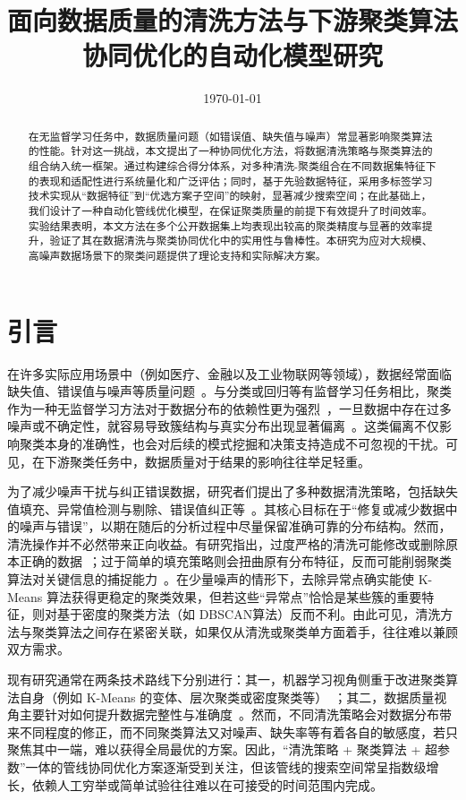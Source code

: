 \documentclass[10pt]{article} %
\numberwithin{equation}{section}
\begin{document}
\title{\textbf{面向数据质量的清洗方法与下游聚类算法协同优化的自动化模型研究}}
\date{\today}
\maketitle
\begin{abstract}
\normalsize
在无监督学习任务中，数据质量问题（如错误值、缺失值与噪声）常显著影响聚类算法的性能。针对这一挑战，本文提出了一种协同优化方法，将数据清洗策略与聚类算法的组合纳入统一框架。通过构建综合得分体系，对多种清洗-聚类组合在不同数据集特征下的表现和适配性进行系统量化和广泛评估；同时，基于先验数据特征，采用多标签学习技术实现从“数据特征”到“优选方案子空间”的映射，显著减少搜索空间；在此基础上，我们设计了一种自动化管线优化模型，在保证聚类质量的前提下有效提升了时间效率。实验结果表明，本文方法在多个公开数据集上均表现出较高的聚类精度与显著的效率提升，验证了其在数据清洗与聚类协同优化中的实用性与鲁棒性。本研究为应对大规模、高噪声数据场景下的聚类问题提供了理论支持和实际解决方案。
\end{abstract}

\section{引言}

在许多实际应用场景中（例如医疗、金融以及工业物联网等领域），数据经常面临缺失值、错误值与噪声等质量问题~\cite{ref1, ref2}。与分类或回归等有监督学习任务相比，聚类作为一种无监督学习方法对于数据分布的依赖性更为强烈~\cite{ref3}，一旦数据中存在过多噪声或不确定性，就容易导致簇结构与真实分布出现显著偏离~\cite{ref4}。这类偏离不仅影响聚类本身的准确性，也会对后续的模式挖掘和决策支持造成不可忽视的干扰。可见，在下游聚类任务中，数据质量对于结果的影响往往举足轻重。

为了减少噪声干扰与纠正错误数据，研究者们提出了多种数据清洗策略，包括缺失值填充、异常值检测与剔除、错误值纠正等~\cite{ref5}。其核心目标在于“修复或减少数据中的噪声与错误”，以期在随后的分析过程中尽量保留准确可靠的分布结构。然而，清洗操作并不必然带来正向收益。有研究指出，过度严格的清洗可能修改或删除原本正确的数据~\cite{ref6}；过于简单的填充策略则会扭曲原有分布特征，反而可能削弱聚类算法对关键信息的捕捉能力~\cite{ref7}。在少量噪声的情形下，去除异常点确实能使 K-Means 算法获得更稳定的聚类效果，但若这些“异常点”恰恰是某些簇的重要特征，则对基于密度的聚类方法（如 DBSCAN算法）反而不利。由此可见，清洗方法与聚类算法之间存在紧密关联，如果仅从清洗或聚类单方面着手，往往难以兼顾双方需求。

现有研究通常在两条技术路线下分别进行：其一，机器学习视角侧重于改进聚类算法自身（例如 K-Means 的变体、层次聚类或密度聚类等）~\cite{ref8, ref9, ref10}；其二，数据质量视角主要针对如何提升数据完整性与准确度~\cite{ref11, ref12}。然而，不同清洗策略会对数据分布带来不同程度的修正，而不同聚类算法又对噪声、缺失率等有着各自的敏感度，若只聚焦其中一端，难以获得全局最优的方案。因此，“清洗策略 + 聚类算法 + 超参数”一体的管线协同优化方案逐渐受到关注，但该管线的搜索空间常呈指数级增长，依赖人工穷举或简单试验往往难以在可接受的时间范围内完成。
\end{document}
